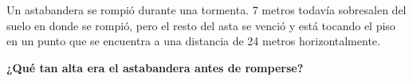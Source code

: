 Un astabandera se rompió durante una tormenta.
7 metros todavía sobresalen del suelo en donde se rompió, pero el resto del asta se venció y
está tocando el piso en un punto que se encuentra a una distancia de 24 metros horizontalmente.

\textbf{¿Qué tan alta era el astabandera antes de romperse?}\\
